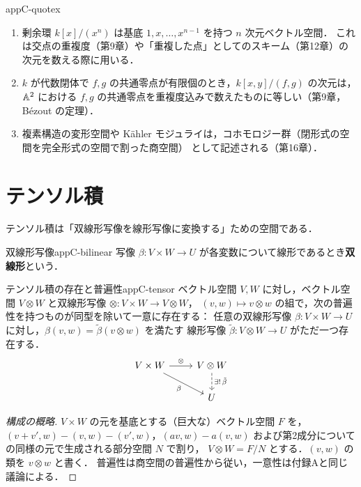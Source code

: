 \begin{myex}{}{appC-quotex}
\begin{enumerate}
\item 剰余環 $k[x]/(x^n)$ は基底 $1,x,\dots,x^{n-1}$ を持つ $n$ 次元ベクトル空間．
これは交点の重複度（第9章）や「重複した点」としてのスキーム（第12章）の次元を数える際に用いる．
\item $k$ が代数閉体で $f,g$ の共通零点が有限個のとき，$k[x,y]/(f,g)$ の次元は，$\mathbb{A}^2$ における $f,g$ の共通零点を重複度込みで数えたものに等しい（第9章，Bézout の定理）．
\item 複素構造の変形空間や Kähler モジュライは，コホモロジー群（閉形式の空間を完全形式の空間で割った商空間）
として記述される（第16章）．
\end{enumerate}
\end{myex}

\section{テンソル積}

テンソル積は「双線形写像を線形写像に変換する」ための空間である．

\begin{mydef}{双線形写像}{appC-bilinear}
写像 $\beta\colon V\times W\to U$ が各変数について線形であるとき\textbf{双線形}という．
\end{mydef}

\begin{mythm}{テンソル積の存在と普遍性}{appC-tensor}
ベクトル空間 $V,W$ に対し，ベクトル空間 $V\otimes W$ と双線形写像 $\otimes\colon V\times W\to V\otimes W$，
$(v,w)\mapsto v\otimes w$ の組で，次の普遍性を持つものが同型を除いて一意に存在する：
任意の双線形写像 $\beta\colon V\times W\to U$ に対し，$\beta(v,w)=\tilde\beta(v\otimes w)$ を満たす
線形写像 $\tilde\beta\colon V\otimes W\to U$ がただ一つ存在する．
\[
\begin{tikzcd}
V\times W \arrow[r,"\otimes"] \arrow[rd,"\beta"'] & V\otimes W \arrow[d,dashed,"\exists!\,\tilde\beta"]\\
 & U
\end{tikzcd}
\]
\end{mythm}
\begin{proof}[構成の概略]
$V\times W$ の元を基底とする（巨大な）ベクトル空間 $F$ を，
$(v+v',w)-(v,w)-(v',w)$，$(av,w)-a(v,w)$ および第2成分についての同様の元で生成される部分空間 $N$ で割り，
$V\otimes W=F/N$ とする．$(v,w)$ の類を $v\otimes w$ と書く．
普遍性は商空間の普遍性から従い，一意性は付録Aと同じ議論による．
\end{proof}

